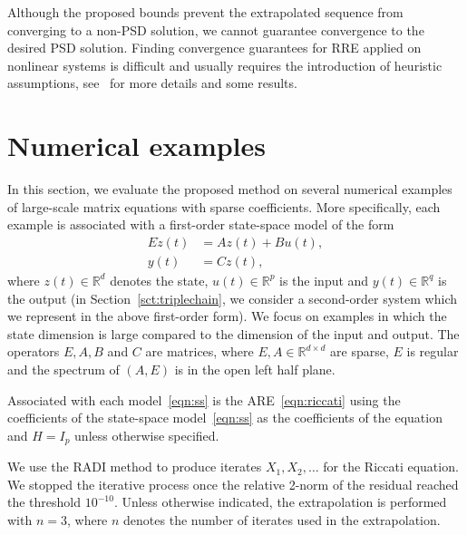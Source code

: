 \begin{remark}\label{remark:convergence_psd_solution}
  Although the proposed bounds prevent the extrapolated sequence from converging to a non-\ac{PSD} solution, we cannot guarantee convergence to the desired \ac{PSD} solution.
  Finding convergence guarantees for \ac{RRE} applied on nonlinear systems is difficult and usually requires the introduction of heuristic assumptions, see~\cite{sidi2020convergence} for more details and some results.
\end{remark}

\section{Numerical examples}\label{sct:numerical_examples}
In this section, we evaluate the proposed method on several numerical examples of large-scale matrix equations with sparse coefficients.
More specifically, each example is associated with a first-order state-space model of the form
\begin{equation}
\begin{aligned}
	E \dot{z}(t) & = A z(t) + B u(t), \\
		    y(t) & = C z(t),
\end{aligned}
\label{eqn:ss}
\end{equation}
where $z(t) \in \mathbb{R}^{d}$ denotes the state, $u(t) \in \mathbb{R}^{p}$ is the input and $y(t) \in \mathbb{R}^{q}$ is the output
(in Section~\ref{sct:triplechain}, we consider a second-order system which we represent in the above first-order form).
We focus on examples in which the state dimension is large compared to the dimension of the input and output.
The operators $E, A, B$ and $C$ are matrices, where $E, A \in \mathbb{R}^{d \times d}$ are sparse, $E$ is regular and the spectrum of $(A, E)$ is in the open left half plane.

Associated with each model~\eqref{eqn:ss} is the \ac{ARE}~\eqref{eqn:riccati} using the coefficients of the state-space model~\eqref{eqn:ss} as the coefficients of the equation and $H = I_p$ unless otherwise specified.

We use the RADI method to produce iterates $X_1, X_2, \ldots$ for the Riccati equation.
We stopped the iterative process once the relative 2-norm of the residual reached the threshold $10^{-10}$.
Unless otherwise indicated, the extrapolation is performed with $n = 3$, where $n$ denotes the number of iterates used in the extrapolation.

